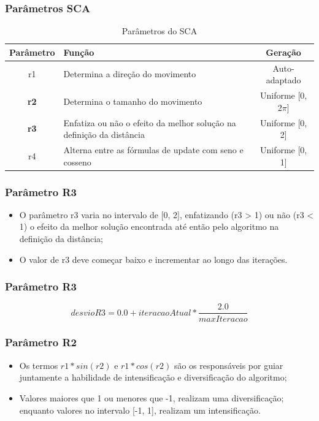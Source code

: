 \documentclass{beamer}
\begin{document}
\begin{frame}
\frametitle{Parâmetros SCA}
\begin{table}[!htpb]
    \centering
    \begin{tabularx}{\textwidth}{c|X|c} %
    
      \textbf{Parâmetro} & \textbf{Função} &  \textbf{Geração} \\
      \hline
      r1 & Determina a direção do movimento & Auto-adaptado\\
      \hline
      \bf{r2} & Determina o tamanho do movimento & Uniforme [0, 2$\pi$] \\
      \hline
      \bf{r3} & Enfatiza ou não o efeito da melhor solução na definição da distância & Uniforme [0, 2] \\
      \hline
      r4 & Alterna entre as fórmulas de update com seno e cosseno & Uniforme [0, 1] \\
    \end{tabularx}
    \caption{Parâmetros do SCA}
    \label{tab:parametros}
\end{table}
\end{frame}

\begin{frame}
\frametitle{Parâmetro R3}
\begin{itemize}
    \item O parâmetro r3 varia no intervalo de [0, 2], enfatizando (r3 > 1) ou não (r3 < 1) o efeito da melhor solução encontrada até então pelo algoritmo na definição da distância; 
    \item O valor de r3 deve começar baixo e incrementar ao longo das iterações.
\end{itemize}
\end{frame}

\begin{frame}
\frametitle{Parâmetro R3}
\begin{equation}
    \label{eq:desvioR3}
    desvioR3 = 0.0 + iteracaoAtual * \frac{2.0}{maxIteracao}
\end{equation}
\end{frame}

\begin{frame}
\frametitle{Parâmetro R2}
\begin{itemize}
    \item Os termos $r1 * sin(r2)$ e $r1 * cos(r2)$ são os responsáveis por guiar juntamente a habilidade de intensificação e diversificação do algoritmo; 
    \item Valores maiores que 1 ou menores que -1, realizam uma diversificação; enquanto valores no intervalo [-1, 1], realizam um intensificação.
\end{itemize}
\end{frame}
\end{document}
